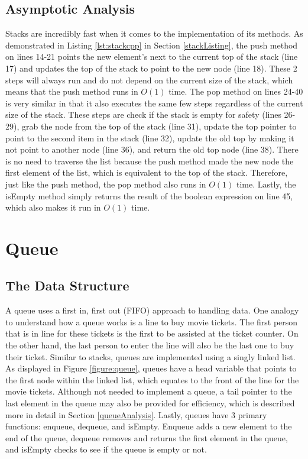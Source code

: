 \documentclass[letterpaper, 10pt,DIV=13]{scrartcl}
\numberwithin{equation}{section} %
\numberwithin{figure}{section} %
\numberwithin{table}{section} %
\begin{document}
\subsection{Asymptotic Analysis}\label{stackAnalysis}
Stacks are incredibly fast when it comes to the implementation of its methods. As demonstrated in Listing \ref{lst:stackcpp} in Section \ref{stackListing}, the push method on lines 14-21 points the new element's next to the current top of the stack (line 17) and updates the top of the stack to point to the new node (line 18). These 2 steps will always run and do not depend on the current size of the stack, which means that the push method runs in $O(1)$ time. The pop method on lines 24-40 is very similar in that it also executes the same few steps regardless of the current size of the stack. These steps are check if the stack is empty for safety (lines 26-29), grab the node from the top of the stack (line 31), update the top pointer to point to the second item in the stack (line 32), update the old top by making it not point to another node (line 36), and return the old top node (line 38). There is no need to traverse the list because the push method made the new node the first element of the list, which is equivalent to the top of the stack. Therefore, just like the push method, the pop method also runs in $O(1)$ time. Lastly, the isEmpty method simply returns the result of the boolean expression on line 45, which also makes it run in $O(1)$ time.

\section{Queue}
\subsection{The Data Structure}
A queue uses a first in, first out (FIFO) approach to handling data. One analogy to understand how a queue works is a line to buy movie tickets. The first person that is in line for these tickets is the first to be assisted at the ticket counter. On the other hand, the last person to enter the line will also be the last one to buy their ticket. Similar to stacks, queues are implemented using a singly linked list. As displayed in Figure \ref{figure:queue}, queues have a head variable that points to the first node within the linked list, which equates to the front of the line for the movie tickets. Although not needed to implement a queue, a tail pointer to the last element in the queue may also be provided for efficiency, which is described more in detail in Section \ref{queueAnalysis}. Lastly, queues have 3 primary functions: enqueue, dequeue, and isEmpty. Enqueue adds a new element to the end of the queue, dequeue removes and returns the first element in the queue, and isEmpty checks to see if the queue is empty or not.
\end{document}
